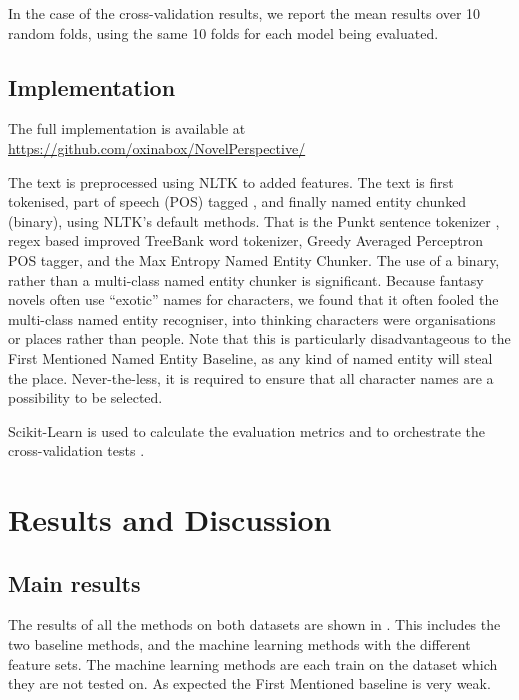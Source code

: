 \documentclass[11pt,a4paper]{article}
\newcommand{\parencite}{\citep}
\begin{document}
In the case of the cross-validation results, we report the mean results over 10 random folds, using the same 10 folds for each model being evaluated.

\subsection{Implementation}
The full implementation is available at \url{https://github.com/oxinabox/NovelPerspective/}

The text is preprocessed using NLTK \parencite{NLTK} to added features.
The text is first tokenised, part of speech (POS) tagged , and finally named entity chunked (binary), using NLTK's default methods.
That is the Punkt sentence tokenizer \parencite{kiss2006unsupervised}, regex based improved TreeBank word tokenizer, Greedy Averaged Perceptron POS tagger, and the Max Entropy Named Entity Chunker.
The use of a binary, rather than a multi-class named entity chunker is significant.
Because fantasy novels often use ``exotic'' names for characters, we found that it often  fooled the multi-class named entity recogniser, into thinking characters were organisations or places rather than people.
Note that this is particularly disadvantageous to the First Mentioned Named Entity Baseline, as any kind of named entity will steal the place.
Never-the-less, it is required to ensure that all character names are a possibility to be selected.

Scikit-Learn is used to calculate the evaluation metrics and to orchestrate the cross-validation tests \parencite{scikit-learn}.


\section{Results and Discussion}\label{sec:results-and-discussion}

\subsection{Main results}

\begin{table*}
	\begin{adjustbox}{max width=\textwidth}
	\end{adjustbox}
	
	\caption{} \label{tbl:resmain}
\end{table*}

The results of all the methods on both datasets are shown in .
This includes the two baseline methods, and the machine learning methods with the different feature sets.
The machine learning methods are each train on the dataset which they are not tested on.
As expected the First Mentioned baseline is very weak.
\end{document}
